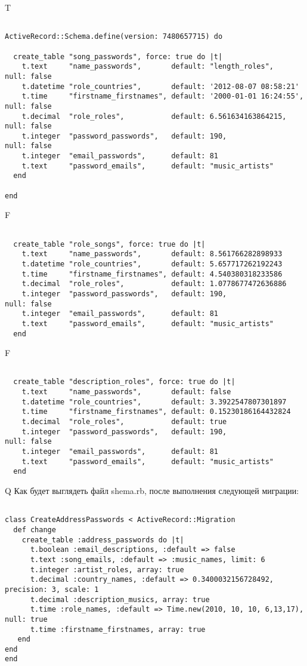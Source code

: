 T
\begin{verbatim}

ActiveRecord::Schema.define(version: 7480657715) do

  create_table "song_passwords", force: true do |t|
    t.text     "name_passwords",       default: "length_roles",        null: false
    t.datetime "role_countries",       default: '2012-08-07 08:58:21'
    t.time     "firstname_firstnames", default: '2000-01-01 16:24:55', null: false
    t.decimal  "role_roles",           default: 6.561634163864215,     null: false
    t.integer  "password_passwords",   default: 190,                   null: false
    t.integer  "email_passwords",      default: 81
    t.text     "password_emails",      default: "music_artists"
  end

end
\end{verbatim}


F
\begin{verbatim}

  create_table "role_songs", force: true do |t|
    t.text     "name_passwords",       default: 8.561766282898933
    t.datetime "role_countries",       default: 5.657717262192243
    t.time     "firstname_firstnames", default: 4.540380318233586
    t.decimal  "role_roles",           default: 1.0778677472636886
    t.integer  "password_passwords",   default: 190,                   null: false
    t.integer  "email_passwords",      default: 81
    t.text     "password_emails",      default: "music_artists"
  end

\end{verbatim}

F
\begin{verbatim}

  create_table "description_roles", force: true do |t|
    t.text     "name_passwords",       default: false
    t.datetime "role_countries",       default: 3.3922547807301897
    t.time     "firstname_firstnames", default: 0.15230186164432824
    t.decimal  "role_roles",           default: true
    t.integer  "password_passwords",   default: 190,                   null: false
    t.integer  "email_passwords",      default: 81
    t.text     "password_emails",      default: "music_artists"
  end

\end{verbatim}

Q
Как будет выглядеть файл shema.rb, после выполнения следующей миграции:

\begin{verbatim}

class CreateAddressPasswords < ActiveRecord::Migration 
  def change 
    create_table :address_passwords do |t| 
      t.boolean :email_descriptions, :default => false
      t.text :song_emails, :default => :music_names, limit: 6
      t.integer :artist_roles, array: true
      t.decimal :country_names, :default => 0.3400032156728492, precision: 3, scale: 1
      t.decimal :description_musics, array: true
      t.time :role_names, :default => Time.new(2010, 10, 10, 6,13,17), null: true
      t.time :firstname_firstnames, array: true
   end
end
end
\end{verbatim}

